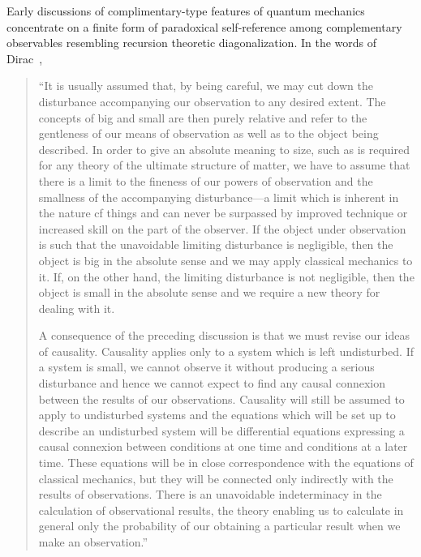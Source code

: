 \documentclass[10pt]{article}%
\begin{document}
Early discussions of complimentary-type features of quantum mechanics \cite{Heisenberg-27,vonNeumann:1927:WAQ}
concentrate on a finite form of paradoxical self-reference among complementary observables resembling recursion theoretic diagonalization. In the words of Dirac~\cite[\S 1]{dirac},
\begin{quote}
{  ``It is usually assumed that, by being careful, we may cut down the
disturbance accompanying our observation to any desired extent.
The concepts of big and small are then purely relative and refer to the
gentleness of our means of observation as well as to the object being
described. In order to give an absolute meaning to size, such as is
required for any theory of the ultimate structure of matter, we have
to assume that there is a limit to the fineness of our powers of observation
and the smallness of the accompanying disturbance---a limit which is
inherent in the nature cf things and can never be surpassed by improved
technique or increased skill on the part of the observer. If the object under
observation is such that the unavoidable limiting disturbance is negligible,
then the object is big in the absolute sense and we may apply
classical mechanics to it. If, on the other hand, the limiting disturbance
is not negligible, then the object is small in the absolute
sense and we require a new theory for dealing with it.

A consequence of the preceding discussion is that we must revise
our ideas of causality. Causality applies only to a system which is
left undisturbed. If a system is small, we cannot observe it without
producing a serious disturbance and hence we cannot expect to find
any causal connexion between the results of our observations.
Causality will still be assumed to apply to undisturbed systems and
the equations which will be set up to describe an undisturbed system
will be differential equations expressing a causal connexion between
conditions at one time and conditions at a later time. These equations
will be in close correspondence with the equations of classical
mechanics, but they will be connected only indirectly with the results
of observations. There is an unavoidable indeterminacy in the calculation
of observational results, the theory enabling us to calculate in
general only the probability of our obtaining a particular result when
we make an observation.''}
\end{quote}
\end{document}
